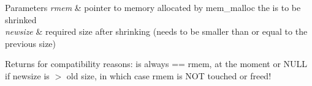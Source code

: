 \begin{DoxyParams}{Parameters}
{\em rmem} & pointer to memory allocated by mem\+\_\+malloc the is to be shrinked \\
\hline
{\em newsize} & required size after shrinking (needs to be smaller than or equal to the previous size) \\
\hline
\end{DoxyParams}
\begin{DoxyReturn}{Returns}
for compatibility reasons\+: is always == rmem, at the moment or N\+U\+LL if newsize is $>$ old size, in which case rmem is N\+OT touched or freed! 
\end{DoxyReturn}
